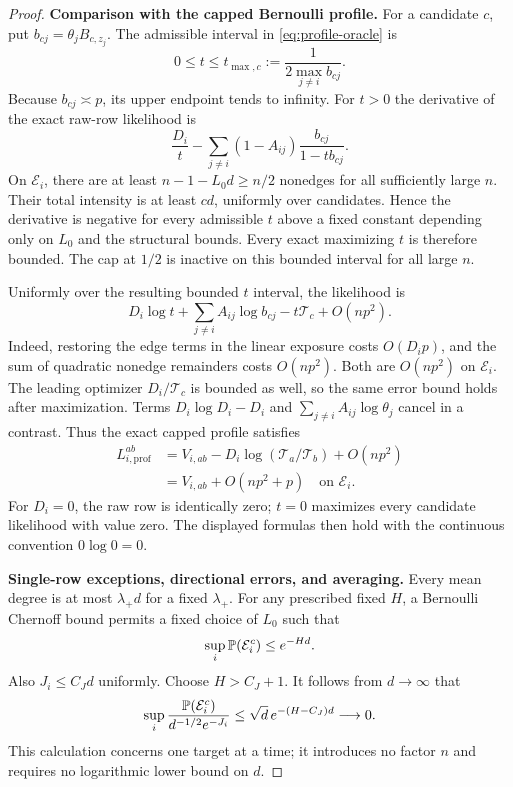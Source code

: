 \begin{proof}
\medskip
\noindent\textbf{Comparison with the capped Bernoulli profile.}
For a candidate \(c\), put \(b_{cj}=\theta_jB_{c,z_j}\).
The admissible interval in \eqref{eq:profile-oracle} is
\[
 0\le t\le t_{\max,c}:=\frac1{2\max_{j\ne i}b_{cj}}.
\]
Because \(b_{cj}\asymp p\), its upper endpoint tends to infinity.
For \(t>0\) the derivative of the exact raw-row likelihood is
\[
 \frac{D_i}{t}
 -
 \sum_{j\ne i}(1-A_{ij})
       \frac{b_{cj}}{1-tb_{cj}} .
\]
On \(\mathcal E_i\), there are at least \(n-1-L_0d\ge n/2\)
nonedges for all sufficiently large \(n\). Their total intensity is
at least \(cd\), uniformly over candidates. Hence the derivative is
negative for every admissible \(t\) above a fixed constant depending
only on \(L_0\) and the structural bounds. Every exact maximizing
\(t\) is therefore bounded. The cap at \(1/2\) is inactive on this
bounded interval for all large \(n\).

Uniformly over the resulting bounded \(t\) interval, the likelihood is
\begin{equation}
 D_i\log t+\sum_{j\ne i}A_{ij}\log b_{cj}
      -t\mathcal T_c+O(np^2).
 \label{dcsbm:classical-profile-expansion}
\end{equation}
Indeed, restoring the edge terms in the linear exposure costs
\(O(D_ip)\), and the sum of quadratic nonedge remainders costs
\(O(np^2)\). Both are \(O(np^2)\) on \(\mathcal E_i\).
The leading optimizer \(D_i/\mathcal T_c\) is bounded as well, so
the same error bound holds after maximization.
Terms \(D_i\log D_i-D_i\) and
\(\sum_{j\ne i}A_{ij}\log\theta_j\) cancel in a contrast.
Thus the exact capped profile satisfies
\begin{align}
 L^{ab}_{i,\mathrm{prof}}
 &=V_{i,ab}
   -D_i\log(\mathcal T_a/\mathcal T_b)+O(np^2)\nonumber\\
 &=V_{i,ab}+O(np^2+p)
 \quad\text{on }\mathcal E_i.
 \label{dcsbm:classical-profile-contrast}
\end{align}
For \(D_i=0\), the raw row is identically zero; \(t=0\) maximizes
every candidate likelihood with value zero. The displayed formulas
then hold with the continuous convention \(0\log0=0\).

\medskip
\noindent\textbf{Single-row exceptions, directional errors, and averaging.}
Every mean degree is at most \(\lambda_+d\) for a fixed \(\lambda_+\).
For any prescribed fixed \(H\), a Bernoulli Chernoff bound permits a
fixed choice of \(L_0\) such that
\begin{equation}
 \sup_i\mathbb P(\mathcal E_i^c)\le e^{-Hd}.
 \label{dcsbm:classical-single-exception}
\end{equation}
Also \(J_i\le C_Jd\) uniformly. Choose \(H>C_J+1\).
It follows from \(d\to\infty\) that
\[
 \sup_i
 \frac{\mathbb P(\mathcal E_i^c)}
      {d^{-1/2}e^{-J_i}}
 \le \sqrt d\,e^{-(H-C_J)d}\longrightarrow0 .
\]
This calculation concerns one target at a time; it introduces no
factor \(n\) and requires no logarithmic lower bound on \(d\).


\end{proof}
